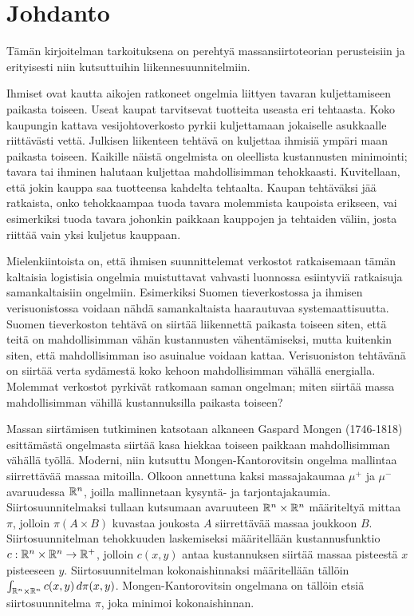 \documentclass[12pt,oneside,a4paper]{amsbook} %
\begin{document}
\pagebreak

\chapter*{Johdanto}
%
Tämän kirjoitelman tarkoituksena on perehtyä massansiirtoteorian perusteisiin ja erityisesti niin kutsuttuihin liikennesuunnitelmiin. 

Ihmiset ovat kautta aikojen ratkoneet ongelmia liittyen tavaran kuljettamiseen paikasta toiseen. Useat kaupat tarvitsevat tuotteita useasta eri tehtaasta. Koko kaupungin kattava vesijohtoverkosto pyrkii kuljettamaan jokaiselle asukkaalle riittävästi vettä. Julkisen liikenteen tehtävä on kuljettaa ihmisiä ympäri maan paikasta toiseen. Kaikille näistä ongelmista on oleellista kustannusten minimointi; tavara tai ihminen halutaan kuljettaa mahdollisimman tehokkaasti. Kuvitellaan, että jokin kauppa saa tuotteensa kahdelta tehtaalta. Kaupan tehtäväksi jää ratkaista, onko tehokkaampaa tuoda tavara molemmista kaupoista erikseen, vai esimerkiksi tuoda tavara johonkin paikkaan kauppojen ja tehtaiden väliin, josta riittää vain yksi kuljetus kauppaan.

Mielenkiintoista on, että ihmisen suunnittelemat verkostot ratkaisemaan tämän kaltaisia logistisia ongelmia muistuttavat vahvasti luonnossa esiintyviä ratkaisuja samankaltaisiin ongelmiin. Esimerkiksi Suomen tieverkostossa ja ihmisen verisuonistossa voidaan nähdä samankaltaista haarautuvaa systemaattisuutta. Suomen tieverkoston tehtävä on siirtää liikennettä paikasta toiseen siten, että teitä on mahdollisimman vähän kustannusten vähentämiseksi, mutta kuitenkin siten, että mahdollisimman iso asuinalue voidaan kattaa. Verisuoniston tehtävänä on siirtää verta sydämestä koko kehoon mahdollisimman vähällä energialla. Molemmat verkostot pyrkivät ratkomaan saman ongelman; miten siirtää massa mahdollisimman vähillä kustannuksilla paikasta toiseen? 

Massan siirtämisen tutkiminen katsotaan alkaneen Gaspard Mongen (1746-1818) esittämästä ongelmasta \cite{monge} siirtää kasa hiekkaa toiseen paikkaan mahdollisimman vähällä työllä. Moderni, niin kutsuttu Mongen-Kantorovitsin ongelma mallintaa siirrettävää massaa mitoilla. Olkoon annettuna kaksi massajakaumaa $\mu^+$ ja $\mu^-$ avaruudessa $\mathbb{R}^n$, joilla mallinnetaan kysyntä- ja tarjontajakaumia. Siirtosuunnitelmaksi tullaan kutsumaan avaruuteen $\mathbb{R}^n \times \mathbb{R}^n$ määriteltyä mittaa $\pi$, jolloin $\pi(A\times B)$ kuvastaa joukosta $A$ siirrettävää massaa joukkoon $B$. Siirtosuunnitelman tehokkuuden laskemiseksi määritellään kustannusfunktio $c:\mathbb{R}^n\times \mathbb{R}^n \to {\mathbb{R}^{+}}$, jolloin $c(x, y)$ antaa kustannuksen siirtää massaa pisteestä $x$ pisteeseen $y$. Siirtosuunnitelman kokonaishinnaksi määritellään tällöin $\int_{\mathbb{R}^n\times \mathbb{R}^n} c(x, y) \, d\pi(x, y)$. Mongen-Kantorovitsin ongelmana on tällöin etsiä siirtosuunnitelma $\pi$, joka minimoi kokonaishinnan. \cite[s. 11]{optimal}
\end{document}

